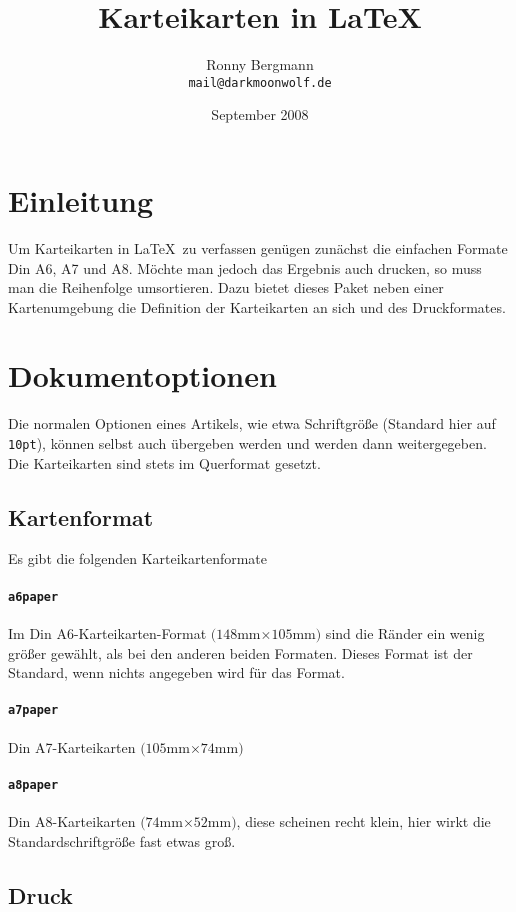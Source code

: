 \documentclass[a4paper]{article}
\begin{document}
\title{Karteikarten in \LaTeX}
\author{Ronny Bergmann\\\texttt{mail@darkmoonwolf.de}}
\date{September 2008}
\maketitle
\section{Einleitung}
Um Karteikarten in \LaTeX\ zu verfassen genügen zunächst die einfachen Formate Din A6, A7 und A8. Möchte man jedoch das Ergebnis auch drucken, so muss man die Reihenfolge umsortieren. Dazu bietet dieses Paket neben einer Kartenumgebung die Definition der Karteikarten an sich und des Druckformates.

\section{Dokumentoptionen}
Die normalen Optionen eines Artikels, wie etwa Schriftgröße (Standard hier auf \lstinline!10pt!), können selbst auch übergeben werden und werden dann 
weitergegeben. Die Karteikarten sind stets im Querformat gesetzt.
\subsection{Kartenformat}
Es gibt die folgenden Karteikartenformate
\paragraph{\lstinline!a6paper!} Im Din A6-Karteikarten-Format $(148$mm$\times 105$mm$)$ sind die Ränder ein wenig größer gewählt, als bei den anderen beiden Formaten. Dieses Format ist der Standard, wenn nichts angegeben wird für das Format.
\paragraph{\lstinline!a7paper!} Din A7-Karteikarten $(105$mm$\times 74$mm$)$
\paragraph{\lstinline!a8paper!} Din A8-Karteikarten $(74$mm$\times 52$mm$)$, diese scheinen recht klein, hier wirkt die Standardschriftgröße fast etwas groß.
\subsection{Druck}
\end{document}

